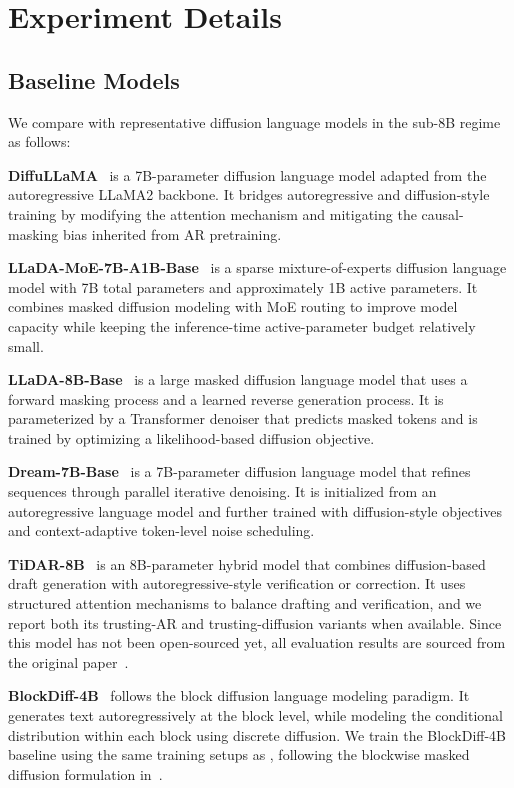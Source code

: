 \section{Experiment Details}

\subsection{Baseline Models}

We compare \method with representative diffusion language models in the sub-8B regime as follows: 

\textbf{DiffuLLaMA}~\citep{DiffuLLaMA} is a 7B-parameter diffusion language model adapted from the autoregressive LLaMA2 backbone. 
It bridges autoregressive and diffusion-style training by modifying the attention mechanism and mitigating the causal-masking bias inherited from AR pretraining.

\textbf{LLaDA-MoE-7B-A1B-Base}~\citep{llada-moe} is a sparse mixture-of-experts diffusion language model with 7B total parameters and approximately 1B active parameters. 
It combines masked diffusion modeling with MoE routing to improve model capacity while keeping the inference-time active-parameter budget relatively small.

\textbf{LLaDA-8B-Base}~\citep{LLaDA} is a large masked diffusion language model that uses a forward masking process and a learned reverse generation process. 
It is parameterized by a Transformer denoiser that predicts masked tokens and is trained by optimizing a likelihood-based diffusion objective.

\textbf{Dream-7B-Base}~\citep{dream7b} is a 7B-parameter diffusion language model that refines sequences through parallel iterative denoising. 
It is initialized from an autoregressive language model and further trained with diffusion-style objectives and context-adaptive token-level noise scheduling.

\textbf{TiDAR-8B}~\citep{tidar} is an 8B-parameter hybrid model that combines diffusion-based draft generation with autoregressive-style verification or correction. 
It uses structured attention mechanisms to balance drafting and verification, and we report both its trusting-AR and trusting-diffusion variants when available. Since this model has not been open-sourced yet, all evaluation results are sourced from the original paper~\citep{tidar}.

\textbf{BlockDiff-4B}~\citep{block_diffusion} follows the block diffusion language modeling paradigm. 
It generates text autoregressively at the block level, while modeling the conditional distribution within each block using discrete diffusion. 
We train the BlockDiff-4B baseline using the same training setups as \method, following the blockwise masked diffusion formulation in~\citep{block_diffusion}.

